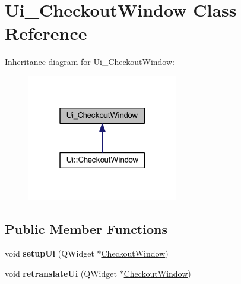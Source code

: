 \hypertarget{class_ui___checkout_window}{}\section{Ui\+\_\+\+Checkout\+Window Class Reference}
\label{class_ui___checkout_window}


Inheritance diagram for Ui\+\_\+\+Checkout\+Window\+:
\nopagebreak
\begin{figure}[H]
\begin{center}
\leavevmode
\includegraphics[width=187pt]{class_ui___checkout_window__inherit__graph}
\end{center}
\end{figure}
\subsection*{Public Member Functions}
\begin{DoxyCompactItemize}
\item 
\mbox{\label{class_ui___checkout_window_afa2930c4b8bed1675a960033ad7dfb75}} 
void {\bfseries setup\+Ui} (Q\+Widget $\ast$\mbox{\hyperlink{class_checkout_window}{Checkout\+Window}})
\item 
\mbox{\label{class_ui___checkout_window_aa4d7330945649474f7dd04f05e3a884d}} 
void {\bfseries retranslate\+Ui} (Q\+Widget $\ast$\mbox{\hyperlink{class_checkout_window}{Checkout\+Window}})
\end{DoxyCompactItemize}
